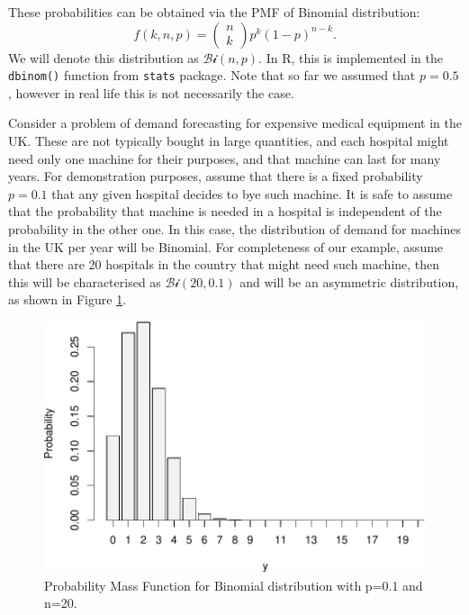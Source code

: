 \documentclass[
]{book}
\theoremstyle{definition}
\theoremstyle{definition}
\theoremstyle{definition}
\theoremstyle{definition}
\theoremstyle{remark}
\begin{document}
These probabilities can be obtained via the PMF of Binomial distribution:
\begin{equation}
    f(k, n, p) = \begin{pmatrix} n \\ k \end{pmatrix} p^k (1-p)^{n-k} .
    \label{eq:BinomialPMF}
\end{equation}
We will denote this distribution as \(\mathcal{Bi}(n, p)\). In R, this is implemented in the \texttt{dbinom()} function from \texttt{stats} package. Note that so far we assumed that \(p=0.5\), however in real life this is not necessarily the case.

Consider a problem of demand forecasting for expensive medical equipment in the UK. These are not typically bought in large quantities, and each hospital might need only one machine for their purposes, and that machine can last for many years. For demonstration purposes, assume that there is a fixed probability \(p=0.1\) that any given hospital decides to bye such machine. It is safe to assume that the probability that machine is needed in a hospital is independent of the probability in the other one. In this case, the distribution of demand for machines in the UK per year will be Binomial. For completeness of our example, assume that there are 20 hospitals in the country that might need such machine, then this will be characterised as \(\mathcal{Bi}(20, 0.1)\) and will be an asymmetric distribution, as shown in Figure \ref{fig:binomialPMF01}.

\begin{figure}
\centering
\includegraphics{Svetunkov---Statistics-for-Business-Analytics_files/figure-latex/binomialPMF01-1.pdf}
\caption{\label{fig:binomialPMF01}Probability Mass Function for Binomial distribution with p=0.1 and n=20.}
\end{figure}
\end{document}

